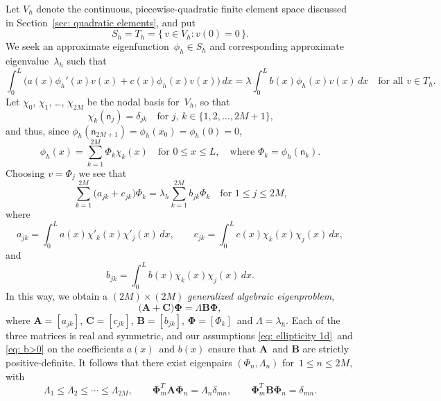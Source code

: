 Let $V_h$ denote the continuous, piecewise-quadratic finite element space 
discussed in Section~\ref{sec: quadratic elements}, and put
\[
S_h=T_h=\{\,v\in V_h:v(0)=0\,\}.
\]
We seek an approximate eigenfunction~$\phi_h\in S_h$ and corresponding 
approximate eigenvalue~$\lambda_h$ such that
\[
\int_0^L\bigl(a(x)\phi_h'(x)v(x)+c(x)\phi_h(x)v(x)\bigr)\,dx
	=\lambda\int_0^Lb(x)\phi_h(x)v(x)\,dx
\quad\text{for all $v\in T_h$.}
\]
Let $\chi_0$, $\chi_1$, \ldots, $\chi_{2M}$ be the nodal basis for~$V_h$, so 
that
\[
\chi_k(\mathsf{n}_j)=\delta_{jk}
	\quad\text{for $j$, $k\in\{1,2,\ldots, 2M+1\}$,}
\]
and thus, since $\phi_h(\mathsf{n}_{2M+1})=\phi_h(x_0)=\phi_h(0)=0$,
\[
\phi_h(x)=\sum_{k=1}^{2M}\Phi_k\chi_k(x)
	\quad\text{for $0\le x\le L$},
	\quad\text{where $\Phi_k=\phi_h(\mathsf{n}_k)$.}
\]
Choosing $v=\Phi_j$ we see that
\[
\sum_{k=1}^{2M}\bigl(a_{jk}+c_{jk}\bigr)\Phi_k
	=\lambda_h\sum_{k=1}^{2M}b_{jk}\Phi_k\quad\text{for $1\le j\le 2M$,}
\]
where
\[
a_{jk}=\int_0^La(x)\chi'_k(x)\chi'_j(x)\,dx,\qquad
c_{jk}=\int_0^Lc(x)\chi_k(x)\chi_j(x)\,dx,
\]
and
\[
b_{jk}=\int_0^Lb(x)\chi_k(x)\chi_j(x)\,dx.
\]
In this way, we obtain a $(2M)\times(2M)$ \emph{generalized algebraic 
eigenproblem},
\[
\bigl(\boldsymbol{A}+\boldsymbol{C}\bigr)\boldsymbol{\Phi}
	=\Lambda\boldsymbol{B}\boldsymbol{\Phi},
\]
where $\boldsymbol{A}=[a_{jk}]$, $\boldsymbol{C}=[c_{jk}]$, 
$\boldsymbol{B}=[b_{jk}]$, $\boldsymbol{\Phi}=[\Phi_k]$~and 
$\Lambda=\lambda_h$.  Each of the three matrices is real and symmetric, and our 
assumptions \eqref{eq: ellipticity 1d}~and \eqref{eq: b>0} on the coefficients 
$a(x)$~and $b(x)$ ensure that $\boldsymbol{A}$~and $\boldsymbol{B}$ are 
strictly positive-definite.  It follows that there exist eigenpairs 
$(\Phi_n,\Lambda_n)$ for~$1\le n\le 2M$, with
\[
\Lambda_1\le\Lambda_2\le\cdots\le\Lambda_{2M},\qquad
\boldsymbol{\Phi}_m^T\boldsymbol{A}\boldsymbol{\Phi}_n=\Lambda_n\delta_{mn},
\qquad
\boldsymbol{\Phi}_m^T\boldsymbol{B}\boldsymbol{\Phi}_n=\delta_{mn}.
\]

